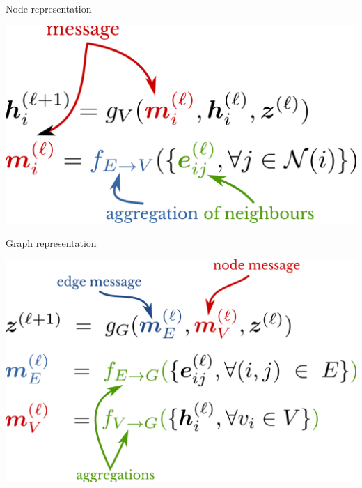 \documentclass[11pt]{beamer}
\begin{document}
\begin{frame}{Node representation}
  
    \begin{center}
      \includegraphics[width=\textwidth]{hi_gn}
    \end{center}
\end{frame}

\begin{frame}{Graph representation}
  
    \begin{center}
      \includegraphics[width=\textwidth]{z_gn}
    \end{center}
\end{frame}
\end{document}
